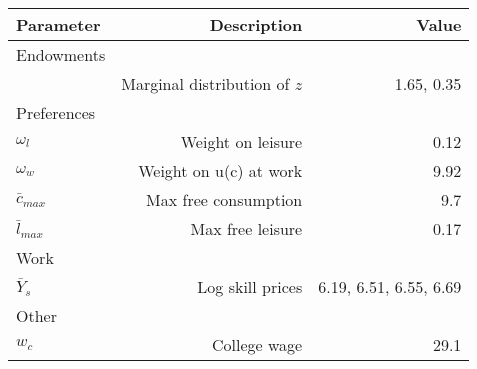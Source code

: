 \begin{tabular}{lrr}
\hline
Parameter & Description  & Value  \\ 
\hline
Endowments &   &   \\ 
 & Marginal distribution of $z$  & 1.65, 0.35  \\ 
Preferences &   &   \\ 
$\omega_{l}$ & Weight on leisure  & 0.12  \\ 
$\omega_{w}$ & Weight on u(c) at work  & 9.92  \\ 
$\bar{c}_{max}$ & Max free consumption  & 9.7  \\ 
$\bar{l}_{max}$ & Max free leisure  & 0.17  \\ 
Work &   &   \\ 
$\bar{Y}_{s}$ & Log skill prices  & 6.19, 6.51, 6.55, 6.69  \\ 
Other &   &   \\ 
$w_{c}$ & College wage  & 29.1  \\ 
\hline
\end{tabular}%
